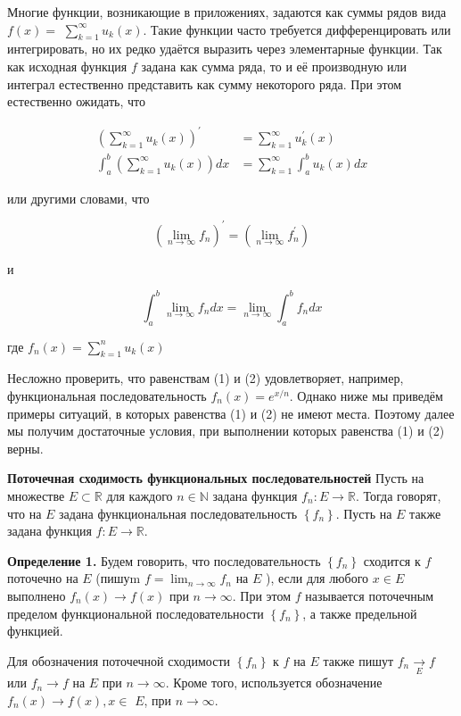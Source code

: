 \documentclass[a4paper,12pt]{article} %
\begin{document}
Многие функции, возникающие в приложениях, задаются как суммы рядов вида $f(x)=$ $\sum_{k=1}^{\infty} u_{k}(x)$. Такие функции часто требуется дифференцировать или интегрировать, но их редко удаётся выразить через элементарные функции. Так как исходная функция $f$ задана как сумма ряда, то и её производную или интеграл естественно представить как сумму некоторого ряда. При этом естественно ожидать, что
	
	$$
	\begin{aligned}
	\left(\sum_{k=1}^{\infty} u_{k}(x)\right)^{\prime} & =\sum_{k=1}^{\infty} u_{k}^{\prime}(x) \\
	\int_{a}^{b}\left(\sum_{k=1}^{\infty} u_{k}(x)\right) d x & =\sum_{k=1}^{\infty} \int_{a}^{b} u_{k}(x) d x
	\end{aligned}
	$$
	
	или другими словами, что
	
	$$
	\left(\lim _{n \rightarrow \infty} f_{n}\right)^{\prime}=\left(\lim _{n \rightarrow \infty} f_{n}^{\prime}\right)
	$$
	
	и
	
	$$
	\int_{a}^{b} \lim _{n \rightarrow \infty} f_{n} d x=\lim _{n \rightarrow \infty} \int_{a}^{b} f_{n} d x
	$$
	
	где $f_{n}(x)=\sum_{k=1}^{n} u_{k}(x)$
	
	Несложно проверить, что равенствам (1) и (2) удовлетворяет, например, функциональная последовательность $f_{n}(x)=e^{x / n}$. Однако ниже мы приведём примеры ситуаций, в которых равенства (1) и (2) не имеют места. Поэтому далее мы получим достаточные условия, при выполнении которых равенства (1) и (2) верны.
	
	\textbf{Поточечная сходимость функциональных последовательностей}
	Пусть на множестве $E \subset \mathbb{R}$ для каждого $n \in \mathbb{N}$ задана функция $f_{n}: E \rightarrow \mathbb{R}$. Тогда говорят, что на $E$ задана функциональная последовательность $\left\{f_{n}\right\}$. Пусть на $E$ также задана функция $f: E \rightarrow \mathbb{R}$.
	
	\textbf{Определение 1.} Будем говорить, что последовательность $\left\{f_{n}\right\}$ сходится к $f$ поточечно на $E$ (пишуm $f=\lim _{n \rightarrow \infty} f_{n}$ на $E$ ), если для любого $x \in E$ выполнено $f_{n}(x) \rightarrow f(x)$ при $n \rightarrow \infty$. При этом $f$ называется поточечным пределом функциональной последовательности $\left\{f_{n}\right\}$, а также предельной функцией.
	
	Для обозначения поточечной сходимости $\left\{f_{n}\right\}$ к $f$ на $E$ также пишут $f_{n} \underset{E}{\rightarrow} f$ или $f_{n} \rightarrow f$ на $E$ при $n \rightarrow \infty$. Кроме того, используется обозначение $f_{n}(x) \rightarrow f(x), x \in$ $E$, при $n \rightarrow \infty$.
	
\end{document}
